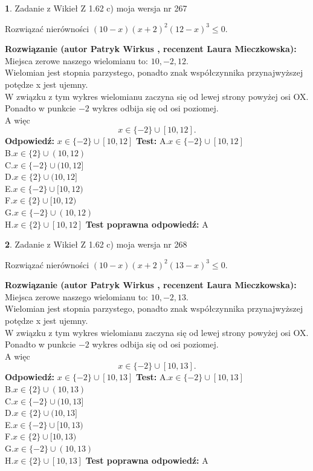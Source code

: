 \documentclass[12pt, a4paper]{article}
\theoremstyle{definition} %
\newtheorem{zad}{}
\newcommand{\zadStart}[1]{\begin{zad}#1\newline}
\newcommand{\zadStop}{\end{zad}}
\newcommand{\rozwStart}[2]{\noindent \textbf{Rozwiązanie (autor #1 , recenzent #2): }\newline}
\newcommand{\rozwStop}{\newline}
\newcommand{\odpStart}{\noindent \textbf{Odpowiedź:}\newline}
\newcommand{\odpStop}{\newline}
\newcommand{\testStart}{\noindent \textbf{Test:}\newline}
\newcommand{\testStop}{\newline}
\newcommand{\kluczStart}{\noindent \textbf{Test poprawna odpowiedź:}\newline}
\newcommand{\kluczStop}{\newline}
\begin{document}
\zadStart{Zadanie z Wikieł Z 1.62 c) moja wersja nr 267}

Rozwiązać nierówności $(10-x)(x+2)^{2}(12-x)^{3}\le0$.
\zadStop
\rozwStart{Patryk Wirkus}{Laura Mieczkowska}
Miejsca zerowe naszego wielomianu to: $10, -2, 12$.\\
Wielomian jest stopnia parzystego, ponadto znak współczynnika przy\linebreak najwyższej potędze x jest ujemny.\\ W związku z tym wykres wielomianu zaczyna się od lewej strony powyżej osi OX.\\
Ponadto w punkcie $-2$ wykres odbija się od osi poziomej.\\
A więc $$x \in \{-2\} \cup [10,12].$$
\rozwStop
\odpStart
$x \in \{-2\} \cup [10,12]$
\odpStop
\testStart
A.$x \in \{-2\} \cup [10,12]$\\
B.$x \in \{2\} \cup (10,12)$\\
C.$x \in \{-2\} \cup (10,12]$\\
D.$x \in \{2\} \cup (10,12]$\\
E.$x \in \{-2\} \cup [10,12)$\\
F.$x \in \{2\} \cup [10,12)$\\
G.$x \in \{-2\} \cup (10,12)$\\
H.$x \in \{2\} \cup [10,12]$
\testStop
\kluczStart
A
\kluczStop



\zadStart{Zadanie z Wikieł Z 1.62 c) moja wersja nr 268}

Rozwiązać nierówności $(10-x)(x+2)^{2}(13-x)^{3}\le0$.
\zadStop
\rozwStart{Patryk Wirkus}{Laura Mieczkowska}
Miejsca zerowe naszego wielomianu to: $10, -2, 13$.\\
Wielomian jest stopnia parzystego, ponadto znak współczynnika przy\linebreak najwyższej potędze x jest ujemny.\\ W związku z tym wykres wielomianu zaczyna się od lewej strony powyżej osi OX.\\
Ponadto w punkcie $-2$ wykres odbija się od osi poziomej.\\
A więc $$x \in \{-2\} \cup [10,13].$$
\rozwStop
\odpStart
$x \in \{-2\} \cup [10,13]$
\odpStop
\testStart
A.$x \in \{-2\} \cup [10,13]$\\
B.$x \in \{2\} \cup (10,13)$\\
C.$x \in \{-2\} \cup (10,13]$\\
D.$x \in \{2\} \cup (10,13]$\\
E.$x \in \{-2\} \cup [10,13)$\\
F.$x \in \{2\} \cup [10,13)$\\
G.$x \in \{-2\} \cup (10,13)$\\
H.$x \in \{2\} \cup [10,13]$
\testStop
\kluczStart
A
\kluczStop
\end{document}
